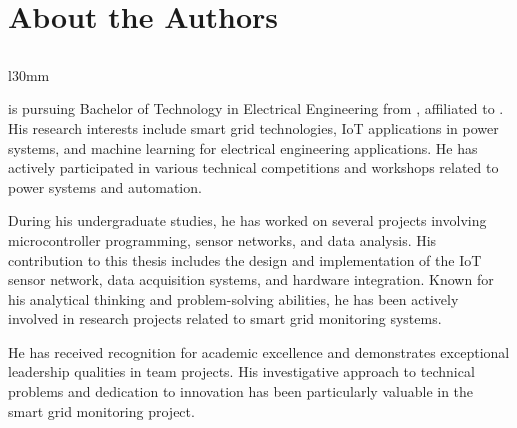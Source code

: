 

\chapter*{About the Authors}
\thispagestyle{plain}
\justifying

\section*{\GetStudentOne}
\begin{wrapfigure}{l}{30mm}
	\vspace{-0.48cm}
\end{wrapfigure}
\justifying

\textbf{\GetStudentOne} is pursuing Bachelor of Technology in Electrical Engineering from \GetCollege, affiliated to \GetUniversity. His research interests include smart grid technologies, IoT applications in power systems, and machine learning for electrical engineering applications. He has actively participated in various technical competitions and workshops related to power systems and automation.

During his undergraduate studies, he has worked on several projects involving microcontroller programming, sensor networks, and data analysis. His contribution to this thesis includes the design and implementation of the IoT sensor network, data acquisition systems, and hardware integration. Known for his analytical thinking and problem-solving abilities, he has been actively involved in research projects related to smart grid monitoring systems.

He has received recognition for academic excellence and demonstrates exceptional leadership qualities in team projects. His investigative approach to technical problems and dedication to innovation has been particularly valuable in the smart grid monitoring project.\\

